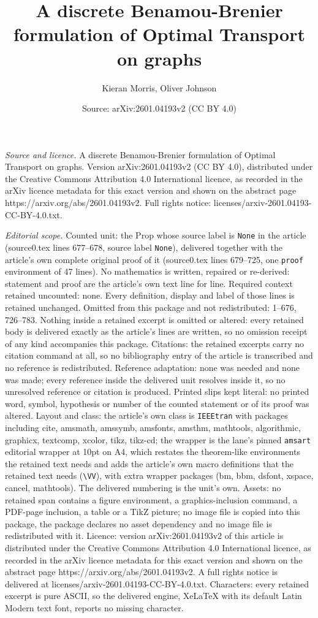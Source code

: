\documentclass[10pt,a4paper]{amsart}
\title[A discrete Benamou-Brenier formulation of Optimal Transport ]{A discrete Benamou-Brenier formulation of Optimal Transport on graphs}
\author{Kieran Morris, Oliver Johnson}
\date{Source: arXiv:2601.04193v2 (CC BY 4.0)}
\begin{document}
\maketitle

\noindent\emph{Source and licence.} A discrete Benamou-Brenier formulation of Optimal Transport on graphs. Version arXiv:2601.04193v2 (CC BY 4.0), distributed under the Creative Commons Attribution 4.0 International licence, as recorded in the arXiv licence metadata for this exact version and shown on the abstract page https://arxiv.org/abs/2601.04193v2. Full rights notice: licenses/arxiv-2601.04193-CC-BY-4.0.txt.\par\smallskip

\noindent\textit{Editorial scope.} Counted unit: the Prop whose source label is \texttt{None} in the article (source0.tex lines 677--678, source label \texttt{None}), delivered together with the article's own complete original proof of it (source0.tex lines 679--725, one \texttt{proof} environment of 47 lines). No mathematics is written, repaired or re-derived: statement and proof are the article's own text line for line. Required context retained uncounted: none. Every definition, display and label of those lines is retained unchanged. Omitted from this package and not redistributed: 1--676, 726--783. Nothing inside a retained excerpt is omitted or altered: every retained body is delivered exactly as the article's lines are written, so no omission receipt of any kind accompanies this package. Citations: the retained excerpts carry no citation command at all, so no bibliography entry of the article is transcribed and no reference is redistributed. Reference adaptation: none was needed and none was made; every reference inside the delivered unit resolves inside it, so no unresolved reference or citation is produced. Printed slips kept literal: no printed word, symbol, hypothesis or number of the counted statement or of its proof was altered. Layout and class: the article's own class is \texttt{IEEEtran} with packages including cite, amsmath, amssymb, amsfonts, amsthm, mathtools, algorithmic, graphicx, textcomp, xcolor, tikz, tikz-cd; the wrapper is the lane's pinned \texttt{amsart} editorial wrapper at 10pt on A4, which restates the theorem-like environments the retained text needs and adds the article's own macro definitions that the retained text needs (\texttt{\textbackslash VV}), with extra wrapper packages (bm, bbm, dsfont, xspace, cancel, mathtools). The delivered numbering is the unit's own. Assets: no retained span contains a figure environment, a graphics-inclusion command, a PDF-page inclusion, a table or a TikZ picture; no image file is copied into this package, the package declares no asset dependency and no image file is redistributed with it. Licence: version arXiv:2601.04193v2 of this article is distributed under the Creative Commons Attribution 4.0 International licence, as recorded in the arXiv licence metadata for this exact version and shown on the abstract page https://arxiv.org/abs/2601.04193v2. A full rights notice is delivered at licenses/arxiv-2601.04193-CC-BY-4.0.txt. Characters: every retained excerpt is pure ASCII, so the delivered engine, XeLaTeX with its default Latin Modern text font, reports no missing character.
\end{document}
